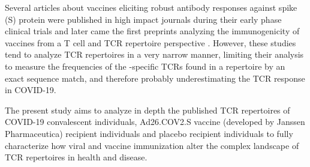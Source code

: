 Several articles about \covid{} vaccines eliciting robust antibody responses against \covid{} spike (S) protein were published in high impact journals during their early phase clinical trials \citep{pfizerab, janssenab, astrazenecaab} and later came the first preprints analyzing the immunogenicity of vaccines from a T cell and TCR repertoire perspective \citep{pfizertcr, janssen, astrazenecatcr}. However, these studies tend to analyze TCR repertoires in a very narrow manner, limiting their analysis to measure the frequencies of the \covid-specific TCRs found in a repertoire by an exact sequence match, and therefore probably underestimating the TCR response in COVID-19.

The present study aims to analyze in depth the published TCR repertoires of COVID-19 convalescent individuals, Ad26.COV2.S vaccine (developed by Janssen Pharmaceutica) recipient individuals and placebo recipient individuals to fully characterize how viral and vaccine immunization alter the complex landscape of TCR repertoires in health and disease.



